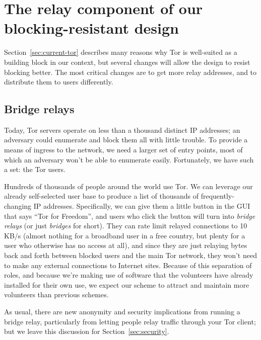 \documentclass{llncs}
\begin{document}
\section{The relay component of our blocking-resistant design}
\label{sec:bridges}

Section~\ref{sec:current-tor} describes many reasons why Tor is
well-suited as a building block in our context, but several changes will
allow the design to resist blocking better. The most critical changes are
to get more relay addresses, and to distribute them to users differently.



\subsection{Bridge relays}

Today, Tor servers operate on less than a thousand distinct IP addresses;
an adversary
could enumerate and block them all with little trouble.  To provide a
means of ingress to the network, we need a larger set of entry points, most
of which an adversary won't be able to enumerate easily.  Fortunately, we
have such a set: the Tor users.

Hundreds of thousands of people around the world use Tor. We can leverage
our already self-selected user base to produce a list of thousands of
frequently-changing IP addresses. Specifically, we can give them a little
button in the GUI that says ``Tor for Freedom'', and users who click
the button will turn into \emph{bridge relays} (or just \emph{bridges}
for short). They can rate limit relayed connections to 10 KB/s (almost
nothing for a broadband user in a free country, but plenty for a user
who otherwise has no access at all), and since they are just relaying
bytes back and forth between blocked users and the main Tor network, they
won't need to make any external connections to Internet sites. Because
of this separation of roles, and because we're making use of software
that the volunteers have already installed for their own use, we expect
our scheme to attract and maintain more volunteers than previous schemes.

As usual, there are new anonymity and security implications from running a
bridge relay, particularly from letting people relay traffic through your
Tor client; but we leave this discussion for Section~\ref{sec:security}.
\end{document}
